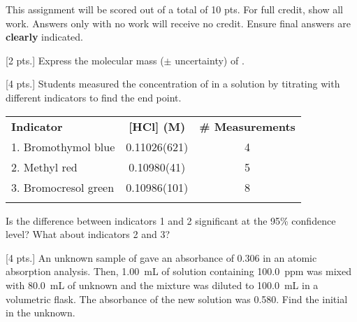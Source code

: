 \documentclass[letterpaper,12pt]{examdesign}
\begin{document}
\begin{examtop}
	\noindent
	\MakeUppercase{\bfseries \examtype}

	\bigskip

	\noindent
This assignment will be scored out of a total of 10 pts. For full credit, show
all work. Answers only with no work will receive no credit. Ensure final
answers are \textbf{clearly} indicated.
\end{examtop}

\begin{shortanswer}
	
	\begin{question}
		{\footnotesize [2 pts.]} Express the molecular mass ($\pm$
		uncertainty) of .
	\end{question}

	\begin{question}
		{\footnotesize [4 pts.]} Students measured the concentration of
		 in a solution by titrating with different indicators to
		find the end point.

		\begin{center}
			\begin{tabu} to \linewidth {l
				S[separate-uncertainty,table-format=1.5(5)] c}
				\tabucline[1pt]{-}
				\bfseries Indicator & {\textbf{[HCl] (M)}} &
				\bfseries \# Measurements \\
				\tabucline[1pt]{-}
				1. Bromothymol blue & 0.11026(621) & 4 \\
				2. Methyl red & 0.10980(41) & 5 \\
				3. Bromocresol green & 0.10986(101) & 8 \\
				\tabucline[1pt]{-}
			\end{tabu}
		\end{center}

		Is the difference between indicators 1 and 2 significant at the
		95\% confidence level? What about indicators 2 and 3?
	\end{question}

	\begin{question}
		{\footnotesize [4 pts.]} An unknown sample of  gave
		an absorbance of 0.306 in an atomic absorption analysis. Then,
		\SI{1.00}{\mL} of solution containing \SI{100.0}{ppm}
		 was mixed with \SI{80.0}{\mL} of unknown and the
		mixture was diluted to \SI{100.0}{\mL} in a volumetric flask.
		The absorbance of the new solution was 0.580. Find the initial
		\ce{[Cu^{2+}]} in the unknown.
	\end{question}
\end{shortanswer}
		
\end{document}
